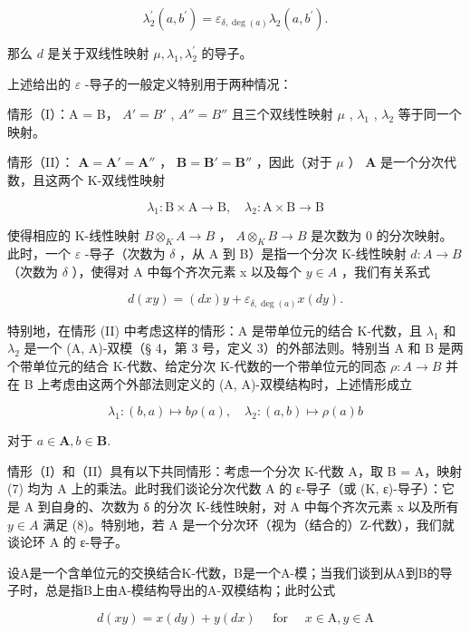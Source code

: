 \[
\lambda_ {2} ^ {\prime} (a, b ^ {\prime}) = \varepsilon_ {\delta , \deg (a)} \lambda_ {2} (a, b ^ {\prime}).
\]

那么 \(d\) 是关于双线性映射 \(\mu, \lambda_{1}, \lambda_{2}^{\prime}\) 的导子。

上述给出的 \(\varepsilon\) -导子的一般定义特别用于两种情况：

情形（I）：A = B， \(A' = B'\) , \(A'' = B''\) 且三个双线性映射 \(\mu\) , \(\lambda_{1}\) , \(\lambda_{2}\) 等于同一个映射。

情形（II）： \(\mathbf{A} = \mathbf{A}' = \mathbf{A}''\) ， \(\mathbf{B} = \mathbf{B}' = \mathbf{B}''\) ，因此（对于 \(\mu\) ） \(\mathbf{A}\) 是一个分次代数，且这两个 K-双线性映射

\[
\lambda_ {1} \colon \mathrm{B} \times \mathrm{A} \rightarrow \mathrm{B}, \quad \lambda_ {2} \colon \mathrm{A} \times \mathrm{B} \rightarrow \mathrm{B}\tag{7}
\]

使得相应的 K-线性映射 \(B \otimes_{K} A \to B\) ， \(A \otimes_{K} B \to B\) 是次数为 0 的分次映射。此时，一个 \(\varepsilon\) -导子（次数为 \(\delta\) ，从 A 到 B）是指一个分次 K-线性映射 \(d: A \to B\) （次数为 \(\delta\) ），使得对 A 中每个齐次元素 x 以及每个 \(y \in A\) ，我们有关系式

\[
d (x y) = (d x) y + \varepsilon_ {\delta , \deg (a)} x (d y).\tag{8}
\]

特别地，在情形 (II) 中考虑这样的情形：A 是带单位元的结合 K-代数，且 \(\lambda_{1}\) 和 \(\lambda_{2}\) 是一个 (A, A)-双模（§ 4，第 3 号，定义 3）的外部法则。特别当 A 和 B 是两个带单位元的结合 K-代数、给定分次 K-代数的一个带单位元的同态 \(\rho: A \to B\) 并在 B 上考虑由这两个外部法则定义的 (A, A)-双模结构时，上述情形成立

\[
\lambda_ {1} \colon (b, a) \mapsto b \rho (a), \quad \lambda_ {2} \colon (a, b) \mapsto \rho (a) b
\]

对于 \(a\in \mathbf{A},b\in \mathbf{B}.\)

情形（I）和（II）具有以下共同情形：考虑一个分次 K-代数 A，取 B = A，映射 (7) 均为 A 上的乘法。此时我们谈论分次代数 A 的 ε-导子（或 (K, ε)-导子）：它是 A 到自身的、次数为 δ 的分次 K-线性映射，对 A 中每个齐次元素 x 以及所有 \(y \in A\) 满足 (8)。特别地，若 A 是一个分次环（视为（结合的）Z-代数），我们就谈论环 A 的 ε-导子。

设A是一个含单位元的交换结合K-代数，B是一个A-模；当我们谈到从A到B的导子时，总是指B上由A-模结构导出的A-双模结构；此时公式

\[
d (x y) = x (d y) + y (d x) \quad \text { for } \quad x \in \mathrm{A}, y \in \mathrm{A}\tag{9}
\]

